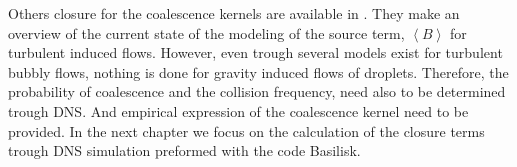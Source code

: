Others closure for the coalescence kernels are available in \citet[Chapter 10]{morel2015mathematical}.
They make an overview of the current state of the modeling of the source term, $\left<B\right>$ for turbulent induced flows. 
However, even trough several models exist for turbulent bubbly flows, nothing is done for gravity induced flows of droplets. 
Therefore, the probability of coalescence and the collision frequency, need also to be determined trough DNS.
And empirical expression of the coalescence kernel need to be provided. 
In the next chapter we focus on the calculation of the closure terms trough DNS simulation preformed with the code Basilisk.